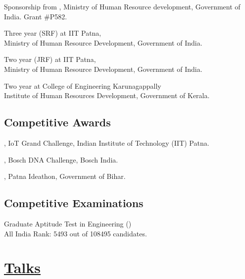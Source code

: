 \documentclass[mm]{simple_style}
\begin{document}
\begin{resume}
Sponsorship from , Ministry of Human Resource development, Government of India. Grant \#P582.  

Three year  (SRF) at IIT Patna, \\
Ministry of Human Resource Development, Government of India. 

Two year  (JRF)  at IIT Patna, \\
Ministry of Human Resource Development, Government of India. 

Two year  at College of Engineering Karunagappally \\
Institute of Human Resources Development, Government of Kerala. 
\halfsectionline
\vspace{-12mm}
\subsection{Competitive Awards}
\vspace{-2ex}

, IoT Grand Challenge, Indian Institute of Technology (IIT) Patna. 

, Bosch DNA Challenge, Bosch India. 

, Patna Ideathon, Government of Bihar.  %
\halfsectionline
\vspace{-12mm}
\subsection{Competitive Examinations}
\vspace{-2ex}

Graduate Aptitude Test in Engineering ()  \\ All India Rank: 5493 out of 108495 candidates. 

\vspace{-2ex}
\sectionline
\section{\href{https://alwynm.github.io/talks}{Talks}}


\end{resume}
\end{document}
